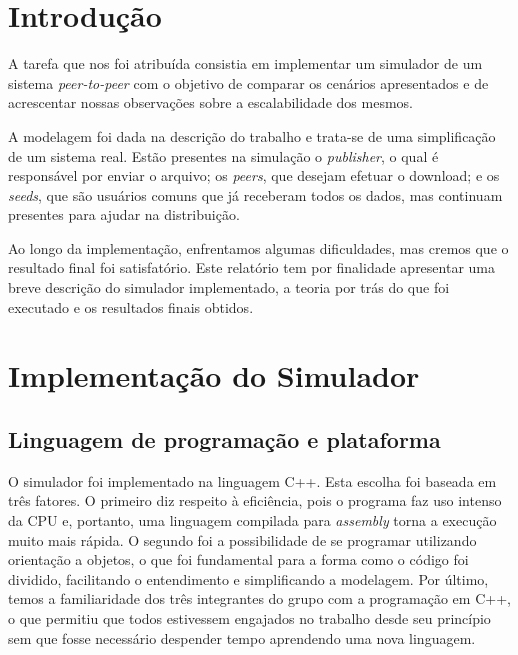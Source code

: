 \documentclass[a4paper,10pt]{article}
\begin{document}
\tableofcontents
\pagebreak

\listoffigures
\pagebreak

\section{Introdução}

A tarefa que nos foi atribuída consistia em implementar um simulador de um sistema \textit{peer-to-peer} com o objetivo de comparar os cenários apresentados e de acrescentar nossas observações sobre a escalabilidade dos mesmos.

A modelagem foi dada na descrição do trabalho e trata-se de uma simplificação de um sistema real. Estão presentes na simulação o \textit{publisher}, o qual é responsável por enviar o arquivo; os \textit{peers}, que desejam efetuar o download; e os \textit{seeds}, que são usuários comuns que já receberam todos os dados, mas continuam presentes para ajudar na distribuição. 

Ao longo da implementação, enfrentamos algumas dificuldades, mas cremos que o resultado final foi satisfatório. Este relatório tem por finalidade apresentar uma breve descrição do simulador implementado, a teoria por trás do que foi executado e os resultados finais obtidos.

\pagebreak

\section{Implementação do Simulador}

\subsection{Linguagem de programação e plataforma}

O simulador foi implementado na linguagem C++. Esta escolha foi baseada em três fatores. O primeiro diz respeito à eficiência, pois o programa faz uso intenso da CPU e, portanto, uma linguagem compilada para \textit{assembly} torna a execução muito mais rápida. O segundo foi a possibilidade de se programar utilizando orientação a objetos, o que foi fundamental para a forma como o código foi dividido, facilitando o entendimento e simplificando a modelagem. Por último, temos a familiaridade dos três integrantes do grupo com a programação em C++, o que permitiu que todos estivessem engajados no trabalho desde seu princípio sem que fosse necessário despender tempo aprendendo uma nova linguagem.
\end{document}
